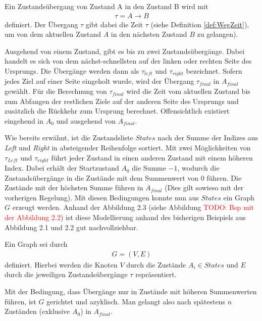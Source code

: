 \documentclass[german,version-2019-11]{uzl-thesis}
\begin{document}
\begin{definition}
Ein Zustandsübergang von Zustand A in den Zustand B wird mit
\begin{align*}
\tau = A\rightarrow B
\end{align*}
definiert. Der Übergang $\tau$ gibt dabei die Zeit $\tau$ (siehe Definition \ref{def:WegZeit}), um von dem aktuellen Zustand $A$ in den nächsten Zustand $B$ zu gelangen).
\end{definition}

Ausgehend von einem Zustand, gibt es bis zu zwei Zustandsübergänge. Dabei handelt es sich von dem nächst-schnellsten auf der linken oder rechten Seite des Ursprungs. Die Übergänge werden dann als $\tau_{left}$ und $\tau_{right}$ bezeichnet. Sofern jedes Ziel auf einer Seite eingeholt wurde, wird der Übergang $\tau_{final}$ in $A_{final}$ gewählt. Für die Berechnung von $\tau_{final}$ wird die Zeit vom aktuellen Zustand bis zum Abfangen der restlichen Ziele auf der anderen Seite des Ursprungs und zusätzlich die Rückkehr zum Ursprung berechnet. Offensichtlich existiert eingehend in $A_0$ und ausgehend von $A_{final}$. 

Wie bereits erwähnt, ist die Zustandsliste $States$ nach der Summe der Indizes aus \emph{Left} und \emph{Right} in absteigender Reihenfolge sortiert. Mit zwei Möglichkeiten von $\tau_{Left}$ und $\tau_{right}$ führt jeder Zustand in einen anderen Zustand mit einem höheren Index. Dabei erhält der Startzustand $A_0$ die Summe $-1$, wodurch die Zustandsübergänge in die Zustände mit dem Summenwert von $0$ führen. Die Zustände mit der höchsten Summe führen in $A_{final}$ (Dies gilt sowieso mit der vorherigen Regelung). Mit diesen Bedingungen konnte nun aus $States$ ein Graph $G$ erzeugt werden. Anhand der Abbildung 2.3 (siehe Abbildung \textcolor{red}{TODO: Bsp mit der Abbildung 2.2}) ist diese Modellierung anhand des bisherigen Beispiels aus Abbildung 2.1 und 2.2 gut nachvollziehbar.

\begin{definition}
Ein Graph sei durch
\begin{align*}
G = (V,E)
\end{align*}
definiert. Hierbei werden die Knoten $V$ durch die Zustände $A_i \in States$ und $E$ durch die jeweiligen Zustandsübergänge $\tau$ repräsentiert.
\end{definition}

Mit der Bedingung, dass Übergänge nur in Zustände mit höheren Summenwerten führen, ist $G$ gerichtet und azyklisch. Man gelangt also nach spätestens $n$ Zuständen (exklusive $A_0$) in $A_{final}$. 
\end{document}
